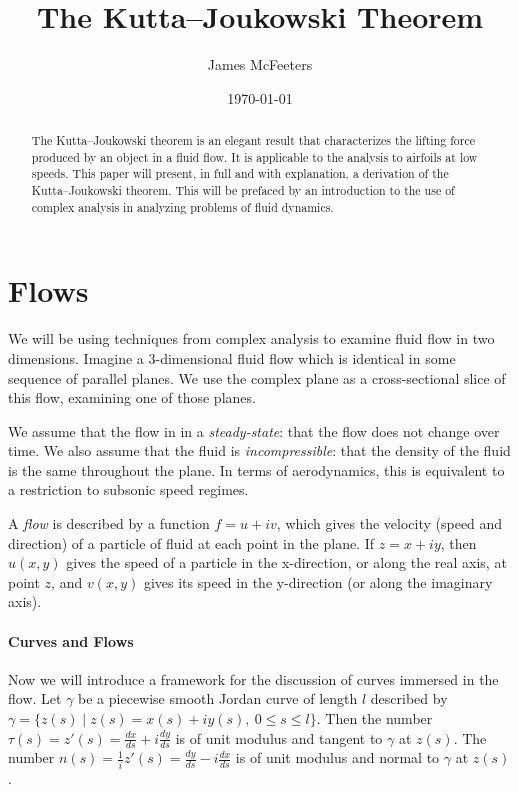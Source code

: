 \documentclass[letterpaper, twoside, 12 pt]{article}
\title{The Kutta--Joukowski Theorem}
\date{\today}
\author{James McFeeters}
\begin{document}
	\maketitle

\begin{abstract}
	The Kutta--Joukowski theorem is an elegant result that characterizes the lifting force produced by an object in a fluid flow. 
	It is applicable to the analysis to airfoils at low speeds.
	This paper will present, in full and with explanation, a derivation of the Kutta--Joukowski theorem.
	This will be prefaced by an introduction to the use of complex analysis in analyzing problems of fluid dynamics.
\end{abstract}

\setlength{\parindent}{0 pt}
\setlength{\parskip}{1 em}

\section{Flows} %
\label{sec:flows}
	We will be using techniques from complex analysis to examine fluid flow in two dimensions.
	Imagine a 3-dimensional fluid flow which is identical in some sequence of parallel planes.
	We use the complex plane as a cross-sectional slice of this flow, examining one of those planes.

	We assume that the flow in in a \textit{steady-state}: that the flow does not change over time.
	We also assume that the fluid is \textit{incompressible}: that the density of the fluid is the same throughout the plane.
	In terms of aerodynamics, this is equivalent to a restriction to subsonic speed regimes.

	\begin{definition}[Flow]
		A \textit{flow} is described by a function $f = u + iv$, which gives the velocity (speed and direction) of a particle of fluid at each point in the plane.
		If $z = x + iy$, then $u(x, y)$ gives the speed of a particle in the x-direction, or along the real axis, at point $z$, and $v(x, y)$ gives its speed in the y-direction (or along the imaginary axis).
	\end{definition}

	\paragraph*{Curves and Flows}
	Now we will introduce a framework for the discussion of curves immersed in the flow.
	Let $\gamma$ be a piecewise smooth Jordan curve of length $l$ described by $\gamma = \{ z(s) \mid z(s) = x(s) + i y(s), \ 0 \leq s \leq l \}$.
	Then the number $\tau(s) = z'(s) = \frac{dx}{ds} + i \frac{dy}{ds}$ is of unit modulus and tangent to $\gamma$ at $z(s)$.
	The number $n(s) = \frac{1}{i} z'(s) = \frac{dy}{ds} - i \frac{dx}{ds}$ is of unit modulus and normal to $\gamma$ at $z(s)$.
\end{document}
